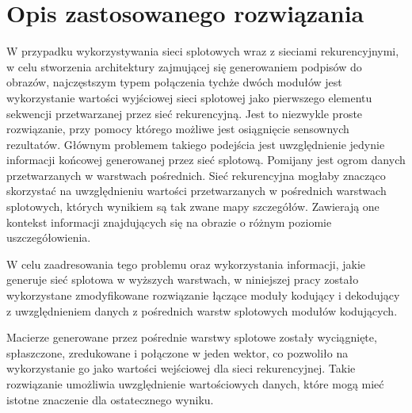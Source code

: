 \newpage %

\section{Opis zastosowanego rozwiązania}
W przypadku wykorzystywania sieci splotowych wraz z sieciami rekurencyjnymi, w celu stworzenia architektury zajmującej się generowaniem podpisów do obrazów, najczęstszym typem połączenia tychże dwóch modułów jest wykorzystanie wartości wyjściowej sieci splotowej jako pierwszego elementu sekwencji przetwarzanej przez sieć rekurencyjną. Jest to niezwykle proste rozwiązanie, przy pomocy którego możliwe jest osiągnięcie sensownych rezultatów. Głównym problemem takiego podejścia jest uwzględnienie jedynie informacji końcowej generowanej przez sieć splotową. Pomijany jest ogrom danych przetwarzanych w warstwach pośrednich. Sieć rekurencyjna mogłaby znacząco skorzystać na uwzględnieniu wartości przetwarzanych w pośrednich warstwach splotowych, których wynikiem są tak zwane mapy szczegółów. Zawierają one kontekst informacji znajdujących się na obrazie o różnym poziomie uszczegółowienia.

W celu zaadresowania tego problemu oraz wykorzystania informacji, jakie generuje sieć splotowa w wyższych warstwach, w niniejszej pracy zostało wykorzystane zmodyfikowane rozwiązanie łączące moduły kodujący i dekodujący z uwzględnieniem danych z pośrednich warstw splotowych modułów kodujących.

Macierze generowane przez pośrednie warstwy splotowe zostały wyciągnięte, spłaszczone, zredukowane i połączone w jeden wektor, co pozwoliło na wykorzystanie go jako wartości wejściowej dla sieci rekurencyjnej. Takie rozwiązanie umożliwia uwzględnienie wartościowych danych, które mogą mieć istotne znaczenie dla ostatecznego wyniku.

